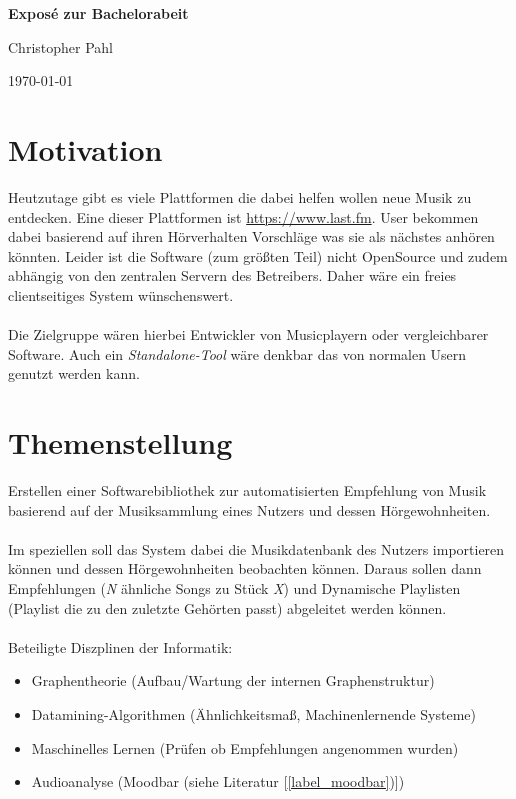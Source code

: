 \documentclass[8pt,a4paper,ngerman]{scrartcl}
\begin{document}

\begin{center}
    \LARGE{\textbf{Exposé zur Bachelorabeit}}
\end{center}
\begin{center}
    \large{Christopher Pahl}
\end{center}
\begin{center}
    \small{\today}
\end{center}

\section{Motivation}
    Heutzutage gibt es viele Plattformen die dabei helfen wollen neue Musik zu
    entdecken. Eine dieser Plattformen ist \url{https://www.last.fm}. User bekommen dabei
    basierend auf ihren Hörverhalten Vorschläge was sie als nächstes anhören
    könnten. Leider ist die Software (zum größten Teil) nicht OpenSource und zudem
    abhängig von den zentralen Servern des Betreibers. Daher wäre ein freies
    clientseitiges System wünschenswert.
    \\
    \\
    Die Zielgruppe wären hierbei Entwickler von Musicplayern oder vergleichbarer
    Software. Auch ein \emph{Standalone-Tool} wäre denkbar das von normalen Usern
    genutzt werden kann.

\section{Themenstellung}
    Erstellen einer Softwarebibliothek zur automatisierten Empfehlung von Musik
    basierend auf der Musiksammlung eines Nutzers und dessen Hörgewohnheiten.
    \\
    \\
    Im speziellen soll das System dabei die Musikdatenbank des Nutzers importieren
    können und dessen Hörgewohnheiten beobachten können. Daraus sollen dann
    Empfehlungen (\textit{N} ähnliche Songs zu Stück \textit{X}) und Dynamische Playlisten 
    (Playlist die zu den zuletzte Gehörten passt) abgeleitet werden können.
    \\
    \\
    Beteiligte Diszplinen der Informatik:

    \begin{itemize}
        \item Graphentheorie (Aufbau/Wartung der internen Graphenstruktur)
        \item Datamining-Algorithmen (Ähnlichkeitsmaß, Machinenlernende Systeme)
        \item Maschinelles Lernen (Prüfen ob Empfehlungen angenommen wurden)
        \item Audioanalyse (Moodbar (siehe Literatur [\ref{label_moodbar})])
    \end{itemize}
\end{document}
